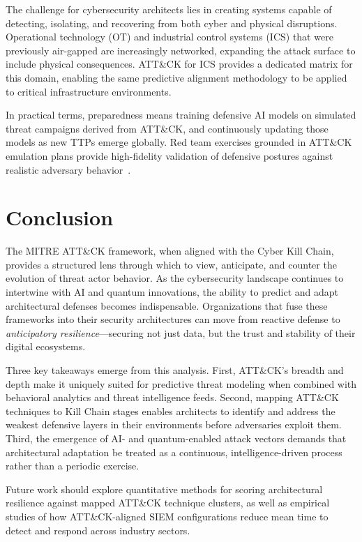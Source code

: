 \documentclass[sigconf,nonacm]{acmart}
\begin{document}
The challenge for cybersecurity architects lies in creating systems capable of
detecting, isolating, and recovering from both cyber and physical disruptions.
Operational technology (OT) and industrial control systems (ICS) that were previously
air-gapped are increasingly networked, expanding the attack surface to include physical
consequences. ATT\&CK for ICS provides a dedicated matrix for this domain, enabling
the same predictive alignment methodology to be applied to critical infrastructure
environments.

In practical terms, preparedness means training defensive AI models on simulated
threat campaigns derived from ATT\&CK, and continuously updating those models
as new TTPs emerge globally. Red team exercises grounded in ATT\&CK emulation
plans provide high-fidelity validation of defensive postures against realistic adversary
behavior~\cite{army2025}.

\section{Conclusion}
\label{sec:conclusion}

The MITRE ATT\&CK framework, when aligned with the Cyber Kill Chain, provides
a structured lens through which to view, anticipate, and counter the evolution of
threat actor behavior. As the cybersecurity landscape continues to intertwine with AI
and quantum innovations, the ability to predict and adapt architectural defenses becomes
indispensable. Organizations that fuse these frameworks into their security architectures
can move from reactive defense to \emph{anticipatory resilience}---securing not just data,
but the trust and stability of their digital ecosystems.

Three key takeaways emerge from this analysis. First, ATT\&CK's breadth and depth
make it uniquely suited for predictive threat modeling when combined with behavioral
analytics and threat intelligence feeds. Second, mapping ATT\&CK techniques to
Kill Chain stages enables architects to identify and address the weakest defensive layers
in their environments before adversaries exploit them. Third, the emergence of AI- and
quantum-enabled attack vectors demands that architectural adaptation be treated as a
continuous, intelligence-driven process rather than a periodic exercise.

Future work should explore quantitative methods for scoring architectural resilience
against mapped ATT\&CK technique clusters, as well as empirical studies of how
ATT\&CK-aligned SIEM configurations reduce mean time to detect and respond across
industry sectors.
\end{document}
